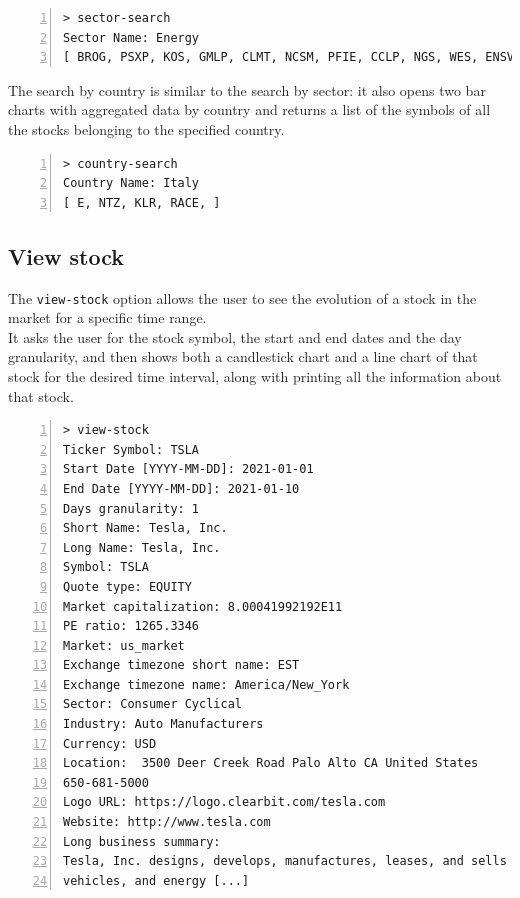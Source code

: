 \begin{lstlisting}[basicstyle=\footnotesize\ttfamily,language={},numbers=left,keepspaces=true,tabsize=4,
numberstyle=\footnotesize,numbersep=8pt,frame=single]
> sector-search
Sector Name: Energy
[ BROG, PSXP, KOS, GMLP, CLMT, NCSM, PFIE, CCLP, NGS, WES, ENSV, FTSI, AXAS, EC, DEN, TTI, NBLX, E, GTE, PSX, PED, NNA, VVV, PVL, AR, HP, CEQP, MUR, DK, RTLR, LEU, NGL, NFG, PTEN, MMLP, PAGP, NESR, NR, PBFX, TRMD, BKR, NOG, ... ]
\end{lstlisting}

The search by country is similar to the search by sector: it also opens two bar charts with aggregated data by country and returns a list of the symbols of all the stocks belonging to the specified country.
\begin{lstlisting}[basicstyle=\footnotesize\ttfamily,language={},numbers=left,keepspaces=true,tabsize=4,
numberstyle=\footnotesize,numbersep=8pt,frame=single]
> country-search
Country Name: Italy
[ E, NTZ, KLR, RACE, ]
\end{lstlisting}
\subsection{View stock}

The \texttt{view-stock} option allows the user to see the evolution of a stock in the market for a specific time range.\\
It asks the user for the stock symbol, the start and end dates and the day granularity, and then shows both a candlestick chart and a line chart of that stock for the desired time interval, along with printing all the information about that stock.

\begin{lstlisting}[basicstyle=\footnotesize\ttfamily,language={},numbers=left,keepspaces=true,tabsize=4,
numberstyle=\footnotesize,numbersep=8pt,frame=single]
> view-stock
Ticker Symbol: TSLA
Start Date [YYYY-MM-DD]: 2021-01-01
End Date [YYYY-MM-DD]: 2021-01-10
Days granularity: 1
Short Name: Tesla, Inc.
Long Name: Tesla, Inc.
Symbol: TSLA
Quote type: EQUITY
Market capitalization: 8.00041992192E11
PE ratio: 1265.3346
Market: us_market
Exchange timezone short name: EST
Exchange timezone name: America/New_York
Sector: Consumer Cyclical
Industry: Auto Manufacturers
Currency: USD
Location:  3500 Deer Creek Road Palo Alto CA United States
650-681-5000
Logo URL: https://logo.clearbit.com/tesla.com
Website: http://www.tesla.com
Long business summary:
Tesla, Inc. designs, develops, manufactures, leases, and sells electric
vehicles, and energy [...]
\end{lstlisting}

